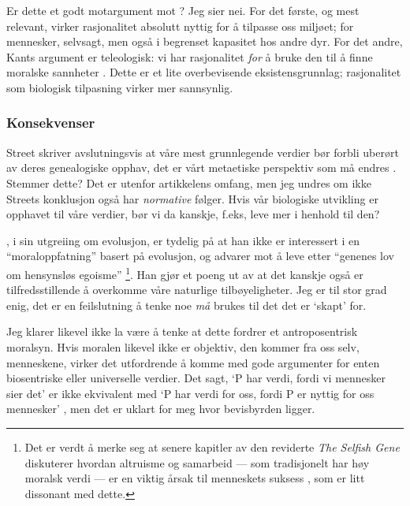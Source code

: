 \documentclass[a4paper,norsk]{article}
\begin{document}
Er dette et godt motargument mot ? Jeg sier nei. For det første,
og mest relevant, virker rasjonalitet absolutt nyttig for å tilpasse oss
miljøet; for mennesker, selvsagt, men også i begrenset kapasitet hos andre dyr.
For det andre, Kants argument er teleologisk: vi har rasjonalitet \emph{for} å
bruke den til å finne moralske sannheter \autocite[4:429]{kant}. Dette er et
lite overbevisende eksistensgrunnlag; rasjonalitet som biologisk tilpasning
virker mer sannsynlig.

\subsubsection*{Konsekvenser}

Street skriver avslutningsvis at våre mest grunnlegende verdier bør forbli
uberørt av deres genealogiske opphav, det er vårt metaetiske perspektiv som må
endres \autocite[453]{street}. Stemmer dette? Det er utenfor artikkelens
omfang, men jeg undres om ikke Streets konklusjon også har \emph{normative}
følger. Hvis vår biologiske utvikling er opphavet til våre verdier, bør vi da
kanskje, f.eks, leve mer i henhold til den?

\citeauthor{dawkins}, i sin utgreiing om evolusjon, er tydelig på at han ikke
er interessert i en \enquote{moraloppfatning} basert på evolusjon, og advarer
mot å leve etter \enquote{genenes lov om hensynsløs egoisme} \autocite[kap.
1]{dawkins}\footnote{Det er verdt å merke seg at senere kapitler av den
reviderte \emph{The Selfish Gene} diskuterer hvordan altruisme og samarbeid ---
som tradisjonelt har høy moralsk verdi --- er en viktig årsak til menneskets
suksess \autocite[kap. 12]{dawkins}, som er litt dissonant med dette.}. Han
gjør et poeng ut av at det kanskje også er tilfredsstillende å overkomme våre
naturlige tilbøyeligheter. Jeg er til stor grad enig, det er en feilslutning å
tenke noe \emph{må} brukes til det det er `skapt' for.

Jeg klarer likevel ikke la være å tenke at dette fordrer et antroposentrisk
moralsyn. Hvis moralen likevel ikke er objektiv, den kommer fra oss selv,
menneskene, virker det utfordrende å komme med gode argumenter for enten
biosentriske eller universelle verdier. Det sagt, `P har verdi, fordi vi
mennesker sier det' er ikke ekvivalent med `P har verdi for oss, fordi P er
nyttig for oss mennesker' \autocite[338]{næss}, men det er uklart for meg hvor
bevisbyrden ligger.
\end{document}
